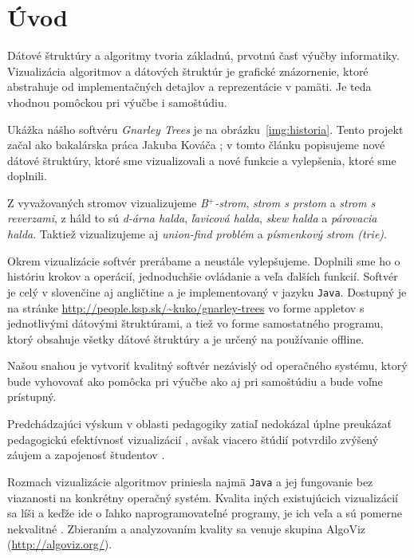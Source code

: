 \section{Úvod}
Dátové štruktúry a algoritmy tvoria základnú, prvotnú časť výučby 
informatiky. Vizualizácia algoritmov a dátových štruktúr je grafické 
znázornenie, ktoré abstrahuje od implementačných detajlov a reprezentácie
v pamäti. Je teda vhodnou pomôckou pri výučbe i samoštúdiu. 

Ukážka nášho softvéru \emph{Gnarley Trees} je na obrázku~\ref{img:historia}.
Tento projekt začal ako bakalárska práca Jakuba Kováča \citep{kuko};
v tomto článku popisujeme nové dátové štruktúry, ktoré sme vizualizovali
a nové funkcie a vylepšenia, ktoré sme doplnili.

Z vyvažovaných stromov vizualizujeme
\emph{B$^+$-strom}, \emph{strom s prstom} a \emph{strom s reverzami}, z háld to sú \emph{d-árna 
halda}, \emph{ľavicová halda}, \emph{skew halda} a \emph{párovacia halda}. 
Taktiež vizualizujeme aj \emph{union-find problém} a 
\emph{písmenkový strom (trie)}. 

Okrem vizualizácie softvér prerábame a neustále vylepšujeme.
Doplnili sme ho o históriu krokov a operácií, jednoduchšie ovládanie
a veľa ďalších funkcií. Softvér je celý v slovenčine aj angličtine a je 
implementovaný v jazyku \texttt{Java}. Dostupný je na stránke
\hbox{\url{http://people.ksp.sk/~kuko/gnarley-trees}} vo forme appletov
s jednotlivými dátovými štruktúrami, a tiež vo forme samostatného programu,
ktorý obsahuje všetky dátové štruktúry a je určený na používanie offline.

Našou snahou je vytvoriť kvalitný softvér nezávislý od operačného systému, 
ktorý bude vyhovovať ako pomôcka pri výučbe ako aj pri samoštúdiu a bude
voľne prístupný. 

Predchádzajúci výskum v oblasti pedagogiky
zatiaľ nedokázal úplne preukázať pedagogickú efektívnosť
vizualizácií \citep{shaffer}, avšak viacero štúdií potvrdilo zvýšený záujem
a zapojenosť študentov \citep{naps02, hundhausen02}.

Rozmach vizualizácie algoritmov priniesla najmä {\tt Java} a jej fungovanie 
bez viazanosti na konkrétny operačný systém. Kvalita iných existujúcich vizualizácií sa líši 
a keďže ide o ľahko naprogramovateľné programy, je ich veľa a sú pomerne 
nekvalitné \citep{shaffer}. 
Zbieraním a analyzovaním kvality sa venuje skupina AlgoViz (\hbox{\url{http://algoviz.org/}}).

